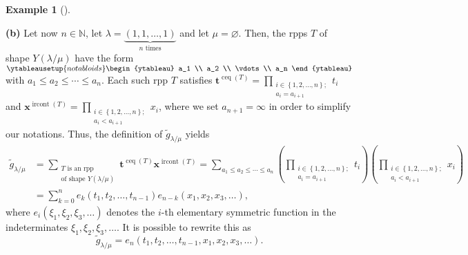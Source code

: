 \documentclass[numbers=enddot,12pt,final,onecolumn,notitlepage]{scrartcl}%
\theoremstyle{definition}
\newtheorem{exmp}[theo]{Example}
\newenvironment{example}[1][]
{\begin{exmp}[#1]\begin{leftbar}}
{\end{leftbar}\end{exmp}}
\let\sumnonlimits\sum
\let\prodnonlimits\prod
\renewcommand{\sum}{\sumnonlimits\limits}
\renewcommand{\prod}{\prodnonlimits\limits}
\begin{document}
\begin{example}
\textbf{(b)} Let now $n\in\mathbb{N}$, let $\lambda=\underbrace{\left(
1,1,\ldots,1\right)  }_{n\text{ times}}$ and let $\mu=\varnothing$. Then, the
rpps $T$ of shape $Y\left(  \lambda/\mu\right)  $ have the form $%
\ytableausetup{notabloids}
\begin{ytableau}
a_1 \\
a_2 \\
\vdots\\
a_n
\end{ytableau}%
$ with $a_{1}\leq a_{2}\leq\cdots\leq a_{n}$. Each such rpp $T$ satisfies
$\mathbf{t}^{\operatorname*{ceq}\left(  T\right)  }=\prod_{\substack{i\in
\left\{  1,2,\ldots,n\right\}  ;\\a_{i}=a_{i+1}}}t_{i}$ and $\mathbf{x}%
^{\operatorname*{ircont}\left(  T\right)  }=\prod_{\substack{i\in\left\{
1,2,\ldots,n\right\}  ;\\a_{i}<a_{i+1}}}x_{i}$, where we set $a_{n+1}=\infty$
in order to simplify our notations. Thus, the definition of $\widetilde{g}%
_{\lambda/\mu}$ yields
\begin{align*}
\widetilde{g}_{\lambda/\mu}  &  =\sum_{\substack{T\text{ is an rpp}\\\text{of
shape }Y\left(  \lambda/\mu\right)  }}\mathbf{t}^{\operatorname*{ceq}\left(
T\right)  }\mathbf{x}^{\operatorname*{ircont}\left(  T\right)  }=\sum
_{a_{1}\leq a_{2}\leq\cdots\leq a_{n}}\left(  \prod_{\substack{i\in\left\{
1,2,\ldots,n\right\}  ;\\a_{i}=a_{i+1}}}t_{i}\right)  \left(  \prod
_{\substack{i\in\left\{  1,2,\ldots,n\right\}  ;\\a_{i}<a_{i+1}}}x_{i}\right)
\\
&  =\sum_{k=0}^{n}e_{k}\left(  t_{1},t_{2},\ldots,t_{n-1}\right)
e_{n-k}\left(  x_{1},x_{2},x_{3},\ldots\right)  ,
\end{align*}
where $e_{i}\left(  \xi_{1},\xi_{2},\xi_{3},\ldots\right)  $ denotes the
$i$-th elementary symmetric function in the indeterminates $\xi_{1},\xi
_{2},\xi_{3},\ldots$. It is possible to rewrite this as%
\[
\widetilde{g}_{\lambda/\mu}=e_{n}\left(  t_{1},t_{2},\ldots,t_{n-1}%
,x_{1},x_{2},x_{3},\ldots\right)  .
\]



\end{example}
\end{document}
